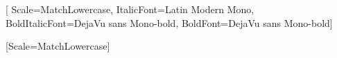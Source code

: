 \usepackage{fontspec}
\setmonofont{Latin Modern Mono}[%
    Scale=MatchLowercase,
    ItalicFont=Latin Modern Mono,
    BoldItalicFont=DejaVu sans Mono-bold,
    BoldFont=DejaVu sans Mono-bold]
\usepackage{newunicodechar}
[Scale=MatchLowercase]
\DeclareTextFontCommand{\textfallback}{\fallbackfont}


